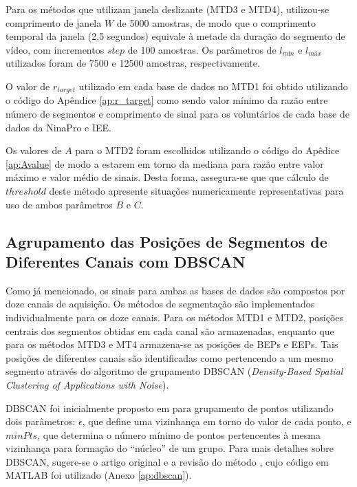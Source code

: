 Para os métodos que utilizam janela deslizante (MTD3 e MTD4), utilizou-se comprimento de janela $W$ de 5000 amostras, de modo que o comprimento temporal da janela (2,5 segundos) equivale à metade da duração do segmento de vídeo, com incrementos $step$ de 100 amostras. Os parâmetros de $l_{mín}$ e $l_{máx}$ utilizados foram de 7500 e 12500 amostras, respectivamente.

O valor de $r_{target}$ utilizado em cada base de dados no MTD1 foi obtido utilizando o código do Apêndice \ref{ap:r_target} como sendo valor mínimo da razão entre número de segmentos e comprimento de sinal para os voluntários de cada base de dados da NinaPro e IEE.

Os valores de $A$ para o MTD2 foram escolhidos utilizando o código do Apêdice \ref{ap:Avalue} de modo a estarem em torno da mediana para razão entre valor máximo e valor médio de sinais. Desta forma, assegura-se que que cálculo de $threshold$ deste método apresente situações numericamente representativas para uso de ambos parâmetros $B$ e $C$.

			\subsection{Agrupamento das Posições de Segmentos de Diferentes Canais com DBSCAN}
Como já mencionado, os sinais para ambas as bases de dados são compostos por doze canais de aquisição. Os métodos de segmentação são implementados individualmente para os doze canais. Para os métodos MTD1 e MTD2, posições centrais dos segmentos obtidas em cada canal são armazenadas, enquanto que para os métodos MTD3 e MT4 armazena-se as posições de BEPs e EEPs. Tais posições de diferentes canais são identificadas como pertencendo a um mesmo segmento através do algoritmo de grupamento DBSCAN (\emph{Density-Based Spatial Clustering of Applications with Noise}).

DBSCAN foi inicialmente proposto em  para grupamento de pontos utilizando dois parâmetros: $\epsilon$, que define uma vizinhança em torno do valor de cada ponto, e $minPts$, que determina o número mínimo de pontos pertencentes à mesma vizinhança para formação do ``núcleo'' de um grupo. Para mais detalhes sobre DBSCAN, sugere-se o artigo original \cite{Ester1996} e a revisão do método \cite{Thanh2013}, cujo código em MATLAB foi utilizado (Anexo \ref{ap:dbscan}). 

